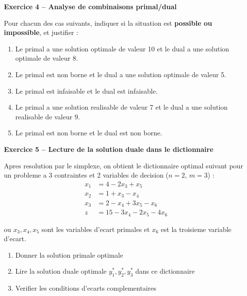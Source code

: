 \documentclass[12pt,a4paper]{article}
\begin{document}
\begin{exemple}
\textbf{Exercice 4 -- Analyse de combinaisons primal/dual}

Pour chacun des cas suivants, indiquer si la situation est \textbf{possible ou impossible}, et justifier :

\begin{enumerate}
    \item Le primal a une solution optimale de valeur 10 et le dual a une solution optimale de valeur 8.
    \item Le primal est non borne et le dual a une solution optimale de valeur 5.
    \item Le primal est infaisable et le dual est infaisable.
    \item Le primal a une solution realisable de valeur 7 et le dual a une solution realisable de valeur 9.
    \item Le primal est non borne et le dual est non borne.
\end{enumerate}
\end{exemple}

\begin{exemple}
\textbf{Exercice 5 -- Lecture de la solution duale dans le dictionnaire}

Apres resolution par le simplexe, on obtient le dictionnaire optimal suivant pour un probleme a 3 contraintes et 2 variables de decision ($n=2$, $m=3$) :
\begin{align*}
x_1 &= 4 - 2x_3 + x_5\\
x_2 &= 1 + x_3 - x_4\\
x_3 &= 2 - x_4 + 3x_5 - x_6\\
z &= 15 - 3x_4 - 2x_5 - 4x_6
\end{align*}

ou $x_3, x_4, x_5$ sont les variables d'ecart primales et $x_6$ est la troisieme variable d'ecart.

\begin{enumerate}
    \item Donner la solution primale optimale
    \item Lire la solution duale optimale $y_1^*, y_2^*, y_3^*$ dans ce dictionnaire
    \item Verifier les conditions d'ecarts complementaires
\end{enumerate}
\end{exemple}
\end{document}
